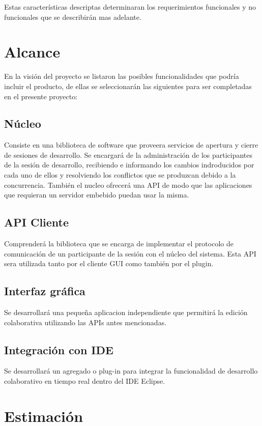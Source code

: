 \documentclass[12pt,a4paper]{article}
\begin{document}
Estas características descriptas determinaran los requerimientos funcionales y no funcionales que se describirán mas adelante.
	\section{Alcance}
	
	En la visión del proyecto se listaron las posibles funcionalidades que podría incluir el producto, de ellas se seleccionarán las siguientes para ser completadas en el presente proyecto:
	
\subsection{Núcleo}
Consiste en una biblioteca de software que proveera servicios de apertura y cierre de sesiones de desarrollo. Se encargará de la administración de los participantes de la sesión de desarrollo, recibiendo e informando los cambios indroducidos por cada uno de ellos y resolviendo los conflictos que se produzcan debido a la concurrencia.
También el nucleo ofrecerá una API de modo que las aplicaciones que requieran un servidor embebido puedan usar la misma.

\subsection{API Cliente}
Comprenderá la biblioteca que se encarga de implementar el protocolo de comunicación de un participante de la sesión con el núcleo del sistema. Esta API sera utilizada tanto por el cliente GUI como también por el plugin.
\subsection{Interfaz gráfica}

Se desarrollará una pequeña aplicacion independiente que permitirá la edición colaborativa utilizando las APIs antes mencionadas.

\subsection{Integración con IDE}
Se desarrollará un agregado o plug-in para integrar la funcionalidad de desarrollo colaborativo en tiempo real dentro del IDE Eclipse.

 
	\section{Estimación}
\end{document}
